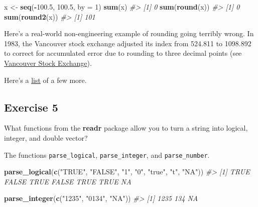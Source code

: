 \documentclass[]{book}
\newenvironment{Shaded}{\begin{snugshade}}{\end{snugshade}}
\newcommand{\CommentTok}[1]{\textcolor[rgb]{0.56,0.35,0.01}{\textit{#1}}}
\newcommand{\DataTypeTok}[1]{\textcolor[rgb]{0.13,0.29,0.53}{#1}}
\newcommand{\DecValTok}[1]{\textcolor[rgb]{0.00,0.00,0.81}{#1}}
\newcommand{\FloatTok}[1]{\textcolor[rgb]{0.00,0.00,0.81}{#1}}
\newcommand{\KeywordTok}[1]{\textcolor[rgb]{0.13,0.29,0.53}{\textbf{#1}}}
\newcommand{\NormalTok}[1]{#1}
\newcommand{\OperatorTok}[1]{\textcolor[rgb]{0.81,0.36,0.00}{\textbf{#1}}}
\newcommand{\StringTok}[1]{\textcolor[rgb]{0.31,0.60,0.02}{#1}}
\theoremstyle{definition}
\theoremstyle{definition}
\theoremstyle{definition}
\theoremstyle{remark}
\begin{document}
\begin{Shaded}
\begin{Highlighting}[]
\NormalTok{x <-}\StringTok{ }\KeywordTok{seq}\NormalTok{(}\OperatorTok{-}\FloatTok{100.5}\NormalTok{, }\FloatTok{100.5}\NormalTok{, }\DataTypeTok{by =} \DecValTok{1}\NormalTok{)}
\KeywordTok{sum}\NormalTok{(x)}
\CommentTok{#> [1] 0}
\KeywordTok{sum}\NormalTok{(}\KeywordTok{round}\NormalTok{(x))}
\CommentTok{#> [1] 0}
\KeywordTok{sum}\NormalTok{(}\KeywordTok{round2}\NormalTok{(x))}
\CommentTok{#> [1] 101}
\end{Highlighting}
\end{Shaded}

Here's a real-world non-engineering example of rounding going terribly
wrong. In 1983, the Vancouver stock exchange adjusted its index from
524.811 to 1098.892 to correct for accumulated error due to rounding to
three decimal points (see
\href{https://en.wikipedia.org/wiki/Vancouver_Stock_Exchange\%5D}{Vancouver
Stock Exchange}).

Here's a
\href{https://www.ma.utexas.edu/users/arbogast/misc/disasters.html}{list}
of a few more.

\hypertarget{exercise-5-14}{%
\subsection{Exercise 5}\label{exercise-5-14}}

What functions from the \textbf{readr} package allow you to turn a
string into logical, integer, and double vector?

The functions \texttt{parse\_logical}, \texttt{parse\_integer}, and
\texttt{parse\_number}.

\begin{Shaded}
\begin{Highlighting}[]
\KeywordTok{parse_logical}\NormalTok{(}\KeywordTok{c}\NormalTok{(}\StringTok{"TRUE"}\NormalTok{, }\StringTok{"FALSE"}\NormalTok{, }\StringTok{"1"}\NormalTok{, }\StringTok{"0"}\NormalTok{, }\StringTok{"true"}\NormalTok{, }\StringTok{"t"}\NormalTok{, }\StringTok{"NA"}\NormalTok{))}
\CommentTok{#> [1]  TRUE FALSE  TRUE FALSE  TRUE  TRUE    NA}
\end{Highlighting}
\end{Shaded}

\begin{Shaded}
\begin{Highlighting}[]
\KeywordTok{parse_integer}\NormalTok{(}\KeywordTok{c}\NormalTok{(}\StringTok{"1235"}\NormalTok{, }\StringTok{"0134"}\NormalTok{, }\StringTok{"NA"}\NormalTok{))}
\CommentTok{#> [1] 1235  134   NA}
\end{Highlighting}
\end{Shaded}
\end{document}
